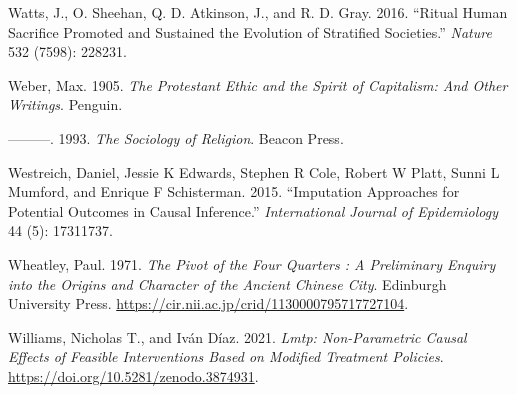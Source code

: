 \documentclass[
  singlecolumn]{report}
\newlength{\cslhangindent}
\newlength{\cslentryspacingunit} %
\newenvironment{CSLReferences}[2] %
 {%
  \setlength{\parindent}{0pt}
  \ifodd #1
  \let\oldpar\par
  \def\par{\hangindent=\cslhangindent\oldpar}
  \fi
  \setlength{\parskip}{#2\cslentryspacingunit}
 }%
 {}
\begin{document}
\begin{CSLReferences}{1}{0}
\leavevmode{}%
Watts, J., O. Sheehan, Q. D. Atkinson, J., and R. D. Gray. 2016.
{``Ritual Human Sacrifice Promoted and Sustained the Evolution of
Stratified Societies.''} \emph{Nature} 532 (7598): 228231.

\leavevmode{}%
Weber, Max. 1905. \emph{The Protestant Ethic and the Spirit of
Capitalism: And Other Writings}. Penguin.

\leavevmode{}%
---------. 1993. \emph{The Sociology of Religion}. Beacon Press.

\leavevmode{}%
Westreich, Daniel, Jessie K Edwards, Stephen R Cole, Robert W Platt,
Sunni L Mumford, and Enrique F Schisterman. 2015. {``Imputation
Approaches for Potential Outcomes in Causal Inference.''}
\emph{International Journal of Epidemiology} 44 (5): 17311737.

\leavevmode{}%
Wheatley, Paul. 1971. \emph{The Pivot of the Four Quarters : A
Preliminary Enquiry into the Origins and Character of the Ancient
Chinese City}. Edinburgh University Press.
\url{https://cir.nii.ac.jp/crid/1130000795717727104}.

\leavevmode{}%
Williams, Nicholas T., and Iván Díaz. 2021. \emph{Lmtp: Non-Parametric
Causal Effects of Feasible Interventions Based on Modified Treatment
Policies}. \url{https://doi.org/10.5281/zenodo.3874931}.

\end{CSLReferences}
\end{document}
